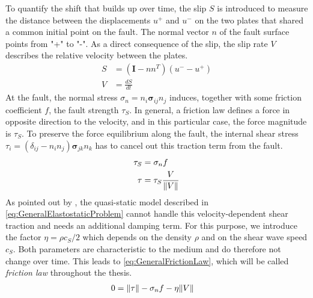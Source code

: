 To quantify the shift that builds up over time, the slip $S$ is introduced to measure the distance between the displacements $u^+$ and $u^-$ on the two plates that shared a common initial point on the fault. The normal vector $n$ of the fault surface points from "+" to "-". As a direct consequence of the slip, the slip rate $V$ describes the relative velocity between the plates.
\begin{align}
	\label{eq:DefinitionSlipAndSlipRate}
	S &= \left(\mathbf{I}-nn^T\right)\left(u^- - u^+\right) \\
	V &= \frac{dS}{dt}
\end{align}
At the fault, the normal stress $\sigma_n = n_i\mathbf{\sigma}_{ij}n_j$ induces, together with some friction coefficient $f$, the fault strength $\tau_S$. In general, a friction law defines a force in opposite direction to the velocity, and in this particular case, the force magnitude is $\tau_S$. To preserve the force equilibrium along the fault, the internal shear stress $\tau_i=(\delta_{ij}-n_in_j)\mathbf{\sigma}_{jk}n_k$ has to cancel out this traction term from the fault. 
\begin{align}
	\tau_S &= \sigma_n f \\
	\tau &= \tau_S\frac{V}{\norm{V}} 
\end{align}
As pointed out by \cite{GeneralSEASSimulations}, the quasi-static model described in \autoref{eq:GeneralElastostaticProblem} cannot handle this velocity-dependent shear traction and needs an additional damping term. For this purpose, we introduce the factor $\eta=\rho c_S/2$ which depends on the density $\rho$ and on the shear wave speed $c_S$. Both parameters are characteristic to the medium and do therefore not change over time. This leads to \autoref{eq:GeneralFrictionLaw}, which will be called \textit{friction law} throughout the thesis. 
\begin{align}
	\label{eq:GeneralFrictionLaw}
	0 &= \norm{\tau} - \sigma_n f - \eta \norm{V}
\end{align}

